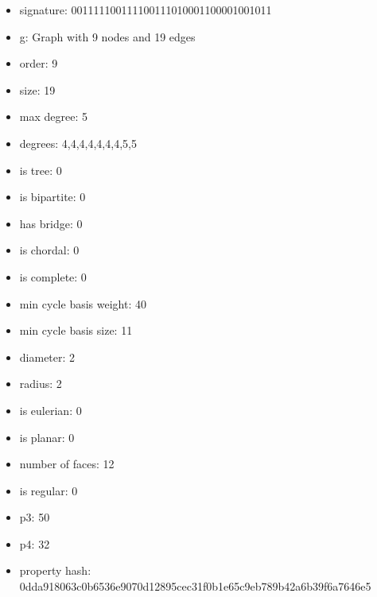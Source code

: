 \newpage
\begin{figure}
\end{figure}
\begin{itemize}
\item signature: 001111100111100111010001100001001011
\item g: Graph with 9 nodes and 19 edges
\item order: 9
\item size: 19
\item max degree: 5
\item degrees: 4,4,4,4,4,4,4,5,5
\item is tree: 0
\item is bipartite: 0
\item has bridge: 0
\item is chordal: 0
\item is complete: 0
\item min cycle basis weight: 40
\item min cycle basis size: 11
\item diameter: 2
\item radius: 2
\item is eulerian: 0
\item is planar: 0
\item number of faces: 12
\item is regular: 0
\item p3: 50
\item p4: 32
\item property hash: 0dda918063c0b6536e9070d12895cec31f0b1e65c9eb789b42a6b39f6a7646e5
\end{itemize}
